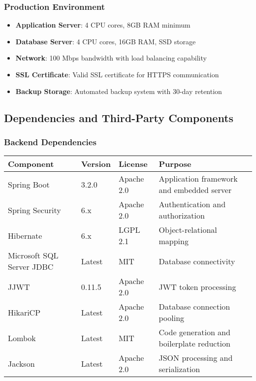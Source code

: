 \documentclass[12pt,a4paper]{article}
\begin{document}
\subsubsection{Production Environment}
\begin{itemize}
    \item \textbf{Application Server}: 4 CPU cores, 8GB RAM minimum
    \item \textbf{Database Server}: 4 CPU cores, 16GB RAM, SSD storage
    \item \textbf{Network}: 100 Mbps bandwidth with load balancing capability
    \item \textbf{SSL Certificate}: Valid SSL certificate for HTTPS communication
    \item \textbf{Backup Storage}: Automated backup system with 30-day retention
\end{itemize}

\subsection{Dependencies and Third-Party Components}

\subsubsection{Backend Dependencies}
\begin{longtable}{|p{3cm}|p{2cm}|p{2cm}|p{5cm}|}
\hline
\textbf{Component} & \textbf{Version} & \textbf{License} & \textbf{Purpose} \\
\hline
Spring Boot & 3.2.0 & Apache 2.0 & Application framework and embedded server \\
\hline
Spring Security & 6.x & Apache 2.0 & Authentication and authorization \\
\hline
Hibernate & 6.x & LGPL 2.1 & Object-relational mapping \\
\hline
Microsoft SQL Server JDBC & Latest & MIT & Database connectivity \\
\hline
JJWT & 0.11.5 & Apache 2.0 & JWT token processing \\
\hline
HikariCP & Latest & Apache 2.0 & Database connection pooling \\
\hline
Lombok & Latest & MIT & Code generation and boilerplate reduction \\
\hline
Jackson & Latest & Apache 2.0 & JSON processing and serialization \\
\hline
\end{longtable}
\end{document}
